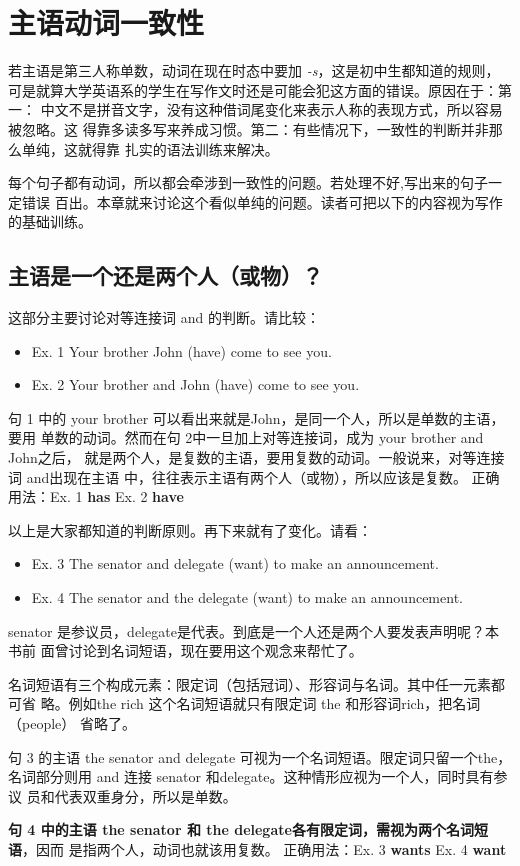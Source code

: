 \documentclass{yufa}
\begin{document}
\chapter{主语动词一致性}

若主语是第三人称单数，动词在现在时态中要加 \emph{-s}，这是初中生都知道的规则，
可是就算大学英语系的学生在写作文时还是可能会犯这方面的错误。原因在于：第一：
中文不是拼音文字，没有这种借词尾变化来表示人称的表现方式，所以容易被忽略。这
得靠多读多写来养成习惯。第二：有些情况下，一致性的判断并非那么单纯，这就得靠
扎实的语法训练来解决。

每个句子都有动词，所以都会牵涉到一致性的问题。若处理不好,写出来的句子一定错误
百出。本章就来讨论这个看似单纯的问题。读者可把以下的内容视为写作的基础训练。

\section{主语是一个还是两个人（或物）？}

这部分主要讨论对等连接词 and 的判断。请比较：
\begin{mybox}
  \begin{itemize}
  \item   Ex. 1 Your brother John (have) come to see you.
  \item   Ex. 2 Your brother and John (have) come to see you.
  \end{itemize}
  句 1 中的 your brother 可以看出来就是John，是同一个人，所以是单数的主语，要用
  单数的动词。然而在句 2中一旦加上对等连接词，成为 your brother and John之后，
  就是两个人，是复数的主语，要用复数的动词。一般说来，对等连接词 and出现在主语
  中，往往表示主语有两个人（或物），所以应该是复数。
  \tcblower
  正确用法：Ex. 1 \textbf{has} \qquad\qquad Ex. 2 \textbf{have}
\end{mybox}

以上是大家都知道的判断原则。再下来就有了变化。请看：

\begin{mybox}

  \begin{itemize}
  \item   Ex. 3 The senator and delegate (want) to make an announcement.
  \item   Ex. 4 The senator and the delegate (want) to make an announcement.
  \end{itemize}
  senator 是参议员，delegate是代表。到底是一个人还是两个人要发表声明呢？本书前
  面曾讨论到名词短语，现在要用这个观念来帮忙了。

  名词短语有三个构成元素：限定词（包括冠词）、形容词与名词。其中任一元素都可省
  略。例如the rich 这个名词短语就只有限定词 the 和形容词rich，把名词（people）
  省略了。

  句 3 的主语 the senator and delegate 可视为一个名词短语。限定词只留一个the，
  名词部分则用 and 连接 senator 和delegate。这种情形应视为一个人，同时具有参议
  员和代表双重身分，所以是单数。

  \textbf{句 4 中的主语 the senator 和 the delegate各有限定词，需视为两个名词短语}，因而
  是指两个人，动词也就该用复数。
  \tcblower
  正确用法：Ex. 3 \textbf{wants} \qquad\quad Ex. 4 \textbf{want}
\end{mybox}
\end{document}
